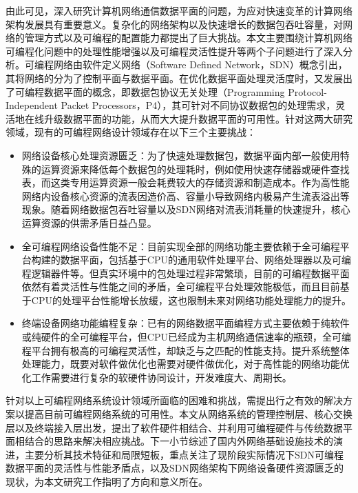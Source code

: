 由此可见，深入研究计算机网络通信数据平面的问题，为应对快速变革的计算网络架构发展具有重要意义。复杂化的网络架构以及快速增长的数据包吞吐容量，对网络的管理方式以及可编程的配置能力都提出了巨大挑战。本文主要围绕计算机网络可编程化问题中的处理性能增强以及可编程灵活性提升等两个子问题进行了深入分析。可编程网络由软件定义网络（Software Defined Network，SDN）概念引出，其将网络的分为了控制平面与数据平面。在优化数据平面处理灵活度时，又发展出了可编程数据平面的概念，即数据包协议无关处理（Programming Protocol-Independent Packet Processors，P4），其可针对不同协议数据包的处理需求，灵活地在线升级数据平面的功能，从而大大提升数据平面的可用性。针对这两大研究领域，现有的可编程网络设计领域存在以下三个主要挑战：


\begin{itemize}
	\item {\hei 网络设备核心处理资源匮乏}：为了快速处理数据包，数据平面内部一般使用特殊的运算资源来降低每个数据包的处理耗时，例如使用快速存储器或硬件查找表，而这类专用运算资源一般会耗费较大的存储资源和制造成本。作为高性能网络内设备核心资源的流表因造价高、容量小导致网络内极易产生流表溢出等现象。随着网络数据包吞吐容量以及SDN网络对流表消耗量的快速提升，核心运算资源的供需矛盾日益凸显。
	\item {\hei 全可编程网络设备性能不足}：目前实现全部的网络功能主要依赖于全可编程平台构建的数据平面，包括基于CPU的通用软件处理平台、网络处理器以及可编程逻辑器件等。但真实环境中的包处理过程非常繁琐，目前的可编程数据平面依然有着灵活性与性能之间的矛盾，全可编程平台处理效能极低，而且目前基于CPU的处理平台性能增长放缓，这也限制未来对网络功能处理能力的提升。
	\item {\hei 终端设备网络功能编程复杂}：已有的网络数据平面编程方式主要依赖于纯软件或纯硬件的全可编程平台，但CPU已经成为主机网络通信速率的瓶颈，全可编程平台拥有极高的可编程灵活性，却缺乏与之匹配的性能支持。提升系统整体处理能力，既要对软件做优化也需要对硬件做优化，对于高性能的网络功能优化工作需要进行复杂的软硬件协同设计，开发难度大、周期长。
\end{itemize}

针对以上可编程网络系统设计领域所面临的困难和挑战，需提出行之有效的解决方案以提高目前可编程网络系统的可用性。本文从网络系统的管理控制层、核心交换层以及终端接入层出发，提出了软件硬件相结合、并利用可编程硬件与传统数据平面相结合的思路来解决相应挑战。下一小节综述了国内外网络基础设施技术的演进，主要分析其技术特征和局限短板，重点关注了现阶段实际情况下SDN可编程数据平面的灵活性与性能矛盾点，以及SDN网络架构下网络设备硬件资源匮乏的现状，为本文研究工作指明了方向和意义所在。










